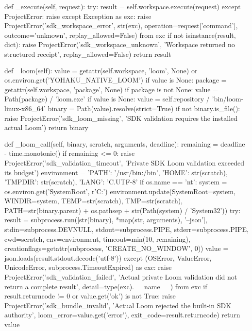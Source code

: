    def _execute(self, request):
        try:
            result = self.workspace.execute(request)
        except ProjectError:
            raise
        except Exception as exc:
            raise ProjectError('sdk_workspace_error', str(exc), operation=request['command'],
                               outcome='unknown', replay_allowed=False) from exc
        if not isinstance(result, dict):
            raise ProjectError('sdk_workspace_unknown', 'Workspace returned no structured receipt', replay_allowed=False)
        return result

    def _loom(self):
        value = getattr(self.workspace, 'loom', None) or os.environ.get('YOHAKU_NATIVE_LOOM')
        if value is None:
            package = getattr(self.workspace, 'package', None)
            if package is not None:
                value = Path(package) / 'loom.exe'
        if value is None:
            value = self.repository / 'bin/loom-linux-x86_64'
        binary = Path(value).resolve(strict=True)
        if not binary.is_file():
            raise ProjectError('sdk_loom_missing', 'SDK validation requires the installed actual Loom')
        return binary

    def _loom_call(self, binary, scratch, arguments, deadline):
        remaining = deadline - time.monotonic()
        if remaining <= 0:
            raise ProjectError('sdk_validation_timeout', 'Private SDK Loom validation exceeded its budget')
        environment = {'PATH': '/usr/bin:/bin', 'HOME': str(scratch), 'TMPDIR': str(scratch), 'LANG': 'C.UTF-8'}
        if os.name == 'nt':
            system = os.environ.get('SystemRoot', r'C:\Windows')
            environment.update(SystemRoot=system, WINDIR=system, TEMP=str(scratch), TMP=str(scratch),
                               PATH=str(binary.parent) + os.pathsep + str(Path(system) / 'System32'))
        try:
            result = subprocess.run([str(binary), *map(str, arguments), '--json'],
                                    stdin=subprocess.DEVNULL, stdout=subprocess.PIPE, stderr=subprocess.PIPE,
                                    cwd=scratch, env=environment, timeout=min(10, remaining),
                                    creationflags=getattr(subprocess, 'CREATE_NO_WINDOW', 0))
            value = json.loads(result.stdout.decode('utf-8'))
        except (OSError, ValueError, UnicodeError, subprocess.TimeoutExpired) as exc:
            raise ProjectError('sdk_validation_failed', 'Actual private Loom validation did not return a complete result',
                               detail=type(exc).__name__) from exc
        if result.returncode != 0 or value.get('ok') is not True:
            raise ProjectError('sdk_bundle_invalid', 'Actual Loom rejected the built-in SDK authority',
                               loom_error=value.get('error'), exit_code=result.returncode)
        return value

